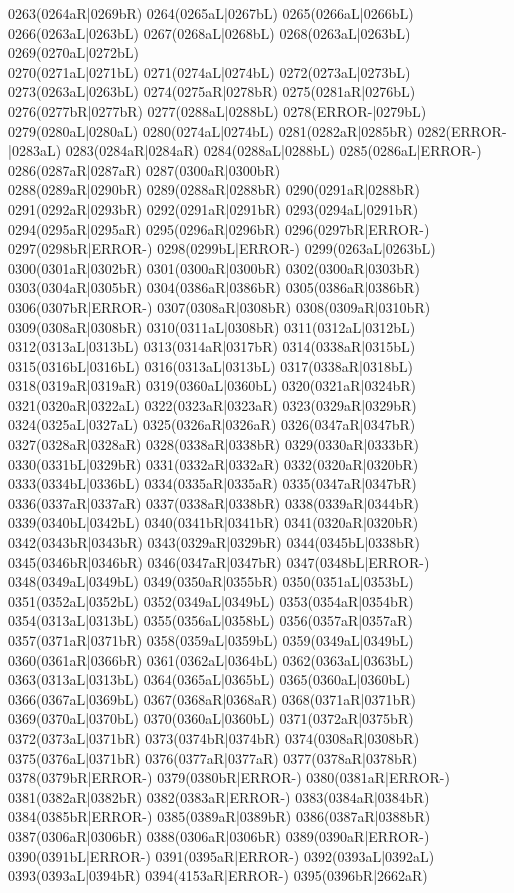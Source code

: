 0263(0264aR|0269bR) 0264(0265aL|0267bL) 0265(0266aL|0266bL) 0266(0263aL|0263bL) 0267(0268aL|0268bL) 0268(0263aL|0263bL) 0269(0270aL|0272bL) \\0270(0271aL|0271bL) 0271(0274aL|0274bL) 0272(0273aL|0273bL) 0273(0263aL|0263bL) 0274(0275aR|0278bR) 0275(0281aR|0276bL) 0276(0277bR|0277bR) 0277(0288aL|0288bL) 0278(ERROR-|0279bL) \\0279(0280aL|0280aL) 0280(0274aL|0274bL) 0281(0282aR|0285bR) 0282(ERROR-|0283aL) 0283(0284aR|0284aR) 0284(0288aL|0288bL) 0285(0286aL|ERROR-) 0286(0287aR|0287aR) 0287(0300aR|0300bR) \\0288(0289aR|0290bR) 0289(0288aR|0288bR) 0290(0291aR|0288bR) 0291(0292aR|0293bR) 0292(0291aR|0291bR) 0293(0294aL|0291bR) 0294(0295aR|0295aR) 0295(0296aR|0296bR) 0296(0297bR|ERROR-) \\0297(0298bR|ERROR-) 0298(0299bL|ERROR-) 0299(0263aL|0263bL) 0300(0301aR|0302bR) 0301(0300aR|0300bR) 0302(0300aR|0303bR) 0303(0304aR|0305bR) 0304(0386aR|0386bR) 0305(0386aR|0386bR) \\0306(0307bR|ERROR-) 0307(0308aR|0308bR) 0308(0309aR|0310bR) 0309(0308aR|0308bR) 0310(0311aL|0308bR) 0311(0312aL|0312bL) 0312(0313aL|0313bL) 0313(0314aR|0317bR) 0314(0338aR|0315bL) \\0315(0316bL|0316bL) 0316(0313aL|0313bL) 0317(0338aR|0318bL) 0318(0319aR|0319aR) 0319(0360aL|0360bL) 0320(0321aR|0324bR) 0321(0320aR|0322aL) 0322(0323aR|0323aR) 0323(0329aR|0329bR) \\0324(0325aL|0327aL) 0325(0326aR|0326aR) 0326(0347aR|0347bR) 0327(0328aR|0328aR) 0328(0338aR|0338bR) 0329(0330aR|0333bR) 0330(0331bL|0329bR) 0331(0332aR|0332aR) 0332(0320aR|0320bR) \\0333(0334bL|0336bL) 0334(0335aR|0335aR) 0335(0347aR|0347bR) 0336(0337aR|0337aR) 0337(0338aR|0338bR) 0338(0339aR|0344bR) 0339(0340bL|0342bL) 0340(0341bR|0341bR) 0341(0320aR|0320bR) \\0342(0343bR|0343bR) 0343(0329aR|0329bR) 0344(0345bL|0338bR) 0345(0346bR|0346bR) 0346(0347aR|0347bR) 0347(0348bL|ERROR-) 0348(0349aL|0349bL) 0349(0350aR|0355bR) 0350(0351aL|0353bL) \\0351(0352aL|0352bL) 0352(0349aL|0349bL) 0353(0354aR|0354bR) 0354(0313aL|0313bL) 0355(0356aL|0358bL) 0356(0357aR|0357aR) 0357(0371aR|0371bR) 0358(0359aL|0359bL) 0359(0349aL|0349bL) \\0360(0361aR|0366bR) 0361(0362aL|0364bL) 0362(0363aL|0363bL) 0363(0313aL|0313bL) 0364(0365aL|0365bL) 0365(0360aL|0360bL) 0366(0367aL|0369bL) 0367(0368aR|0368aR) 0368(0371aR|0371bR) \\0369(0370aL|0370bL) 0370(0360aL|0360bL) 0371(0372aR|0375bR) 0372(0373aL|0371bR) 0373(0374bR|0374bR) 0374(0308aR|0308bR) 0375(0376aL|0371bR) 0376(0377aR|0377aR) 0377(0378aR|0378bR) \\0378(0379bR|ERROR-) 0379(0380bR|ERROR-) 0380(0381aR|ERROR-) 0381(0382aR|0382bR) 0382(0383aR|ERROR-) 0383(0384aR|0384bR) 0384(0385bR|ERROR-) 0385(0389aR|0389bR) 0386(0387aR|0388bR) \\0387(0306aR|0306bR) 0388(0306aR|0306bR) 0389(0390aR|ERROR-) 0390(0391bL|ERROR-) 0391(0395aR|ERROR-) 0392(0393aL|0392aL) 0393(0393aL|0394bR) 0394(4153aR|ERROR-) 0395(0396bR|2662aR) 